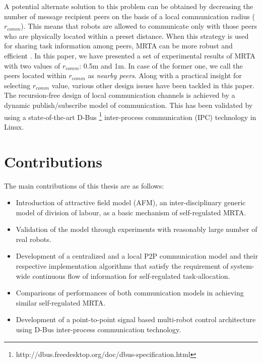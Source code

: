 A potential alternate solution to this problem can be obtained by decreasing the number of message recipient peers on the basis of a local communication radius ($r_{comm}$). This means that robots are allowed to communicate only with those peers who are physically located within a preset distance. When this strategy is used for sharing task information among peers, MRTA can be more robust and efficient \cite{Agassounon}. In this paper, we have presented a set of experimental results of MRTA with two values of $r_{comm}$: 0.5m and 1m. In case of the former one, we call the peers located within $r_{comm}$ as {\em nearby peers}. Along with a practical insight for selecting $r_{comm}$ value, various other design issues have been tackled in this paper. The recursion-free design of local communication channels is achieved by a dynamic publish/subscribe model of communication. This has been validated by using a state-of-the-art D-Bus \footnote{http://dbus.freedesktop.org/doc/dbus-specification.html} inter-process communication (IPC) technology in Linux.
\section{Contributions}
The main contributions of this thesis are as follows:
\begin{itemize}
\item Introduction of attractive field model (AFM), an  inter-disciplinary generic model of division of labour, as a basic mechanism of  self-regulated MRTA.
\item Validation of the model through experiments with reasonably large number of real robots.
\item Development of a centralized and a local P2P communication model and their respective implementation algorithms that satisfy the requirement of system-wide continuous flow of information for self-regulated task-allocation.
\item Comparisons of performances of both communication models in achieving similar self-regulated MRTA.
\item Development of a point-to-point signal based multi-robot control architecture using D-Bus inter-process communication technology.
\end{itemize}
